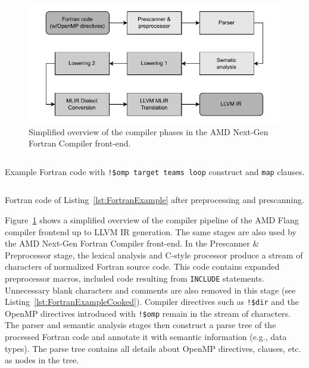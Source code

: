 \documentclass[acmtog,natbib=false]{acmart}
\newcommand{\code}[1]{\texttt{#1}\xspace}
\begin{document}
\begin{figure}[t]
\centering
\includegraphics[width=\linewidth]{figures/flang_compiler_phases_overview.pdf}
\caption{Simplified overview of the compiler phases in the AMD Next-Gen Fortran Compiler front-end.\label{fig:FlangCompilerPhases}}
\end{figure}

\begin{listing}[t]
\inputminted{Fortran}{code/tgt_loop.f90}
\caption{Example Fortran code with \code{!\$omp target teams loop} construct and \code{map} clauses.}
\label{lst:FortranExample}
\end{listing}

\begin{listing}[t]
\inputminted{text}{code/tgt_loop_cooked.f90}
\caption{Fortran code of Listing~\ref{lst:FortranExample} after preprocessing and prescanning.}
\label{lst:FortranExampleCooked}
\end{listing}

Figure~\ref{fig:FlangCompilerPhases} shows a simplified overview of the compiler pipeline of the AMD Flang compiler frontend up to LLVM \ac{IR} generation.
The same stages are also used by the AMD Next-Gen Fortran Compiler front-end.
In the Prescanner \& Preprocessor stage, the lexical analysis and C-style processor produce a stream of characters of normalized Fortran source code. 
This code contains expanded preprocessor macros, included code resulting from \code{INCLUDE} statements. Unnecessary blank characters and comments are also removed in this stage (see Listing~\ref{lst:FortranExampleCooked}).
Compiler directives such as \code{!\$dir} and the OpenMP directives introduced with \code{!\$omp} remain in the stream of characters.
The parser and semantic analysis stages then construct a parse tree of the processed Fortran code and annotate it with semantic information (e.g., data types).
The parse tree contains all details about OpenMP directives, clauses, etc. as nodes in the tree.
\end{document}
